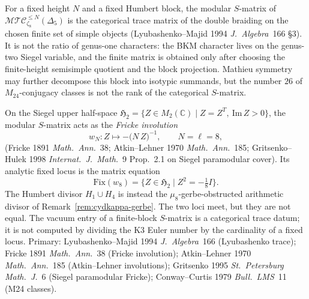 \begin{remark}
\label{rem:cydkappa-s-matrix-fricke}
For a fixed height \(N\) and a fixed Humbert block, the modular
\(S\)-matrix of
\(\mathcal{MTC}^{\leq N}_{\zeta_8}(\Delta_5)\) is the categorical
trace matrix of the double braiding on the chosen finite set of simple
objects (Lyubashenko--Majid 1994 \emph{J.~Algebra}~166 \S3). It is not
the ratio of genus-one characters: the BKM character lives on the
genus-two Siegel variable, and the finite matrix is obtained only after
choosing the finite-height semisimple quotient and the block projection.
Mathieu symmetry may further decompose this block into isotypic
summands, but the number \(26\) of \(M_{24}\)-conjugacy classes is not
the rank of the categorical \(S\)-matrix.

On the Siegel upper half-space
$\mathfrak H_2 = \{Z\in M_2(\mathbb C)\mid Z=Z^T,\ \mathrm{Im}\,Z>0\}$,
the modular $S$-matrix acts as the \emph{Fricke involution}
\[
 w_N \colon Z \longmapsto -\bigl(N\,Z\bigr)^{-1},
 \qquad N = \ell = 8,
\]
(Fricke 1891 \emph{Math.~Ann.}~38; Atkin--Lehner 1970
\emph{Math.~Ann.}~185; Gritsenko--Hulek 1998 \emph{Internat.~J.~Math.}~9
Prop.~2.1 on Siegel paramodular cover). Its analytic fixed locus is
the matrix equation
\[
 \mathrm{Fix}(w_8)=\{Z\in\mathfrak H_2\mid Z^2=-\tfrac18 I\}.
\]
The Humbert divisor \(H_1\cup H_4\) is instead the
\(\mu_8\)-gerbe-obstructed arithmetic divisor of
Remark~\ref{rem:cydkappa-gerbe}. The two loci meet, but they are not
equal. The vacuum entry of a finite-block \(S\)-matrix is a
categorical trace datum; it is not computed by dividing the K3 Euler
number by the cardinality of a fixed locus. Primary: Lyubashenko--Majid
1994 \emph{J.~Algebra}~166 (Lyubashenko trace);
Fricke 1891 \emph{Math.~Ann.}~38 (Fricke involution); Atkin--Lehner
1970 \emph{Math.~Ann.}~185 (Atkin--Lehner involutions);
Gritsenko 1995 \emph{St.~Petersburg Math.~J.}~6 (Siegel paramodular
Fricke); Conway--Curtis 1979 \emph{Bull.~LMS}~11 (M24 classes).
\end{remark}

